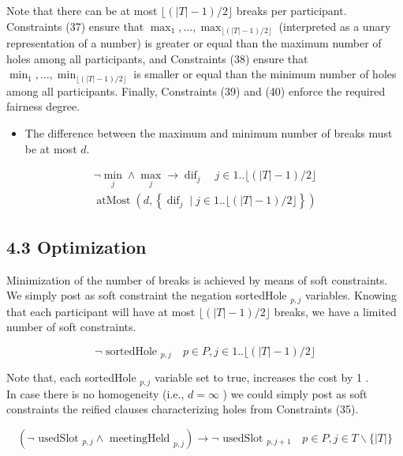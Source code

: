 \documentclass[10pt]{article}
\begin{document}
Note that there can be at most $\lfloor(|T|-1) / 2\rfloor$ breaks per participant.\\
Constraints (37) ensure that $\max _{1}, \ldots, \max _{\lfloor(|T|-1) / 2\rfloor}$ (interpreted as a unary representation of a number) is greater or equal than the maximum number of holes among all participants, and Constraints (38) ensure that $\min _{1}, \ldots, \min _{\lfloor(|T|-1) / 2\rfloor}$ is smaller or equal than the minimum number of holes among all participants. Finally, Constraints (39) and (40) enforce the required fairness degree.

\begin{itemize}
  \item The difference between the maximum and minimum number of breaks must be at most $d$.
\end{itemize}


\begin{gather*}
\neg \min _{j} \wedge \max _{j} \rightarrow \operatorname{dif}_{j} \quad j \in 1 . .\lfloor(|T|-1) / 2\rfloor  \tag{39}\\
\operatorname{atMost}\left(d,\left\{\operatorname{dif}_{j} \mid j \in 1 . .\lfloor(|T|-1) / 2\rfloor\right\}\right) \tag{40}
\end{gather*}


\subsection*{4.3 Optimization}
Minimization of the number of breaks is achieved by means of soft constraints. We simply post as soft constraint the negation sortedHole ${ }_{p, j}$ variables. Knowing that each participant will have at most $\lfloor(|T|-1) / 2\rfloor$ breaks, we have a limited number of soft constraints.


\begin{equation*}
\neg \text { sortedHole }_{p, j} \quad p \in P, j \in 1 . .\lfloor(|T|-1) / 2\rfloor \tag{41}
\end{equation*}


Note that, each sortedHole $_{p, j}$ variable set to true, increases the cost by 1 .\\
In case there is no homogeneity (i.e., $d=\infty$ ) we could simply post as soft constraints the reified clauses characterizing holes from Constraints (35).


\begin{equation*}
\left(\neg \text { usedSlot }_{p, j} \wedge \text { meetingHeld }_{p, j}\right) \rightarrow \neg \text { usedSlot }_{p, j+1} \quad p \in P, j \in T \backslash\{|T|\} \tag{42}
\end{equation*}
\end{document}
